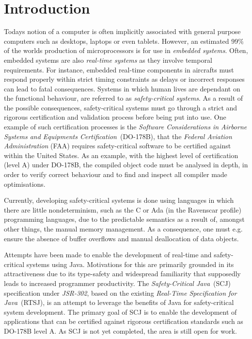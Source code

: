 \chapter{Introduction}
\label{chapter:introduction}
Todays notion of a computer is often implicitly associated with general purpose computers such as desktops, laptops or even tablets. However, an estimated 99\% of the worlds production of microprocessors is for use in \textit{embedded systems}\cite{alan2001real}. Often, embedded systems are also \textit{real-time systems} as they involve temporal requirements. For instance, embedded real-time components in aircrafts must respond properly within strict timing constraints as delays or incorrect responses can lead to fatal consequences. Systems in which human lives are dependant on the functional behaviour, are referred to as \textit{safety-critical systems}\cite{SCJSpec}. As a result of the possible consequences, safety-critical systems must go through a strict and rigorous certification and validation process before being put into use. One example of such certification processes is the \textit{Software Considerations in Airborne Systems and Equipments Certification}~(DO-178B)\cite{DO178B}, that the \textit{Federal Aviation Administration} (FAA) requires safety-critical software to be certified against within the United States. As an example, with the highest level of certification (level A) under DO-178B, the compiled object code must be analysed in depth, in order to verify correct behaviour and to find and inspect all compiler made optimisations\cite{DO178B-Example}.
		
Currently, developing safety-critical systems is done using languages in which there are little nondeterminism, such as the C or Ada (in the Ravenscar profile) programming languages, due to the predictable semantics as a result of, amongst other things, the manual memory management. As a consequence, one must e.g. ensure the absence of buffer overflows and manual deallocation of data objects.

Attempts have been made to enable the development of real-time and safety-critical systems using Java. Motivations for this are primarily grounded in its attractiveness due to its type-safety and widespread familiarity that supposedly leads to increased programmer productivity\cite{henties:2009-20, Nilsen96issuesin}. The \textit{Safety-Critical Java}~(SCJ) specification under \textit{JSR-302}\cite{JSR, SCJSpec}, based on the existing \textit{Real-Time Specification for Java}~(RTSJ)\cite{RTSJSpec}, is an attempt to leverage the benefits of Java for safety-critical system development. The primary goal of SCJ is to enable the development of applications that can be certified against rigorous certification standards such as DO-178B level A. As SCJ is not yet completed, the area is still open for work.

